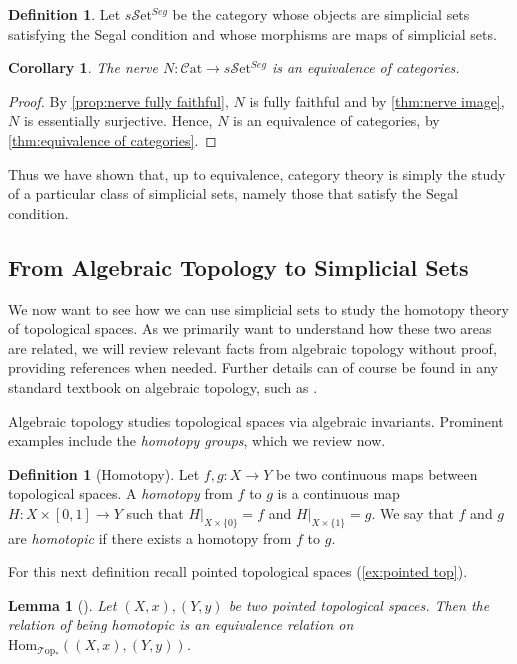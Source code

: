\documentclass[11pt, a4paper]{amsart}
\newcommand{\Hom}{\mathrm{Hom}}
\newcommand{\sSet}{s\mathscr{S}\mathrm{et}}
\newcommand{\Cat}{\mathscr{C}\mathrm{at}}
\newcommand{\Top}{\mathscr{T}\mathrm{op}}
\newtheorem{lemma}[equation]{Lemma}
\newtheorem{corollary}[equation]{Corollary}
\theoremstyle{definition}
\newtheorem{definition}[equation]{Definition}
\theoremstyle{remark}
\numberwithin{equation}{section}
\begin{document}
\begin{definition}
  Let $\sSet^{Seg}$ be the category whose objects are simplicial sets satisfying the Segal condition and whose morphisms are maps of simplicial sets.
\end{definition}

\begin{corollary} \label{cor:nerve equivalence}
  The nerve $N\colon \Cat \to \sSet^{Seg}$ is an equivalence of categories.
\end{corollary}

\begin{proof}
 By \cref{prop:nerve fully faithful}, $N$ is fully faithful and by \cref{thm:nerve image}, $N$ is essentially surjective. Hence, $N$ is an equivalence of categories, by \cref{thm:equivalence of categories}.
\end{proof}

Thus we have shown that, up to equivalence, category theory is simply the study of a particular class of simplicial sets, namely those that satisfy the Segal condition.

\subsection{From Algebraic Topology to Simplicial Sets} \label{subsec:top to ss}
We now want to see how we can use simplicial sets to study the homotopy theory of topological spaces. As we primarily want to understand how these two areas are related, we will review relevant facts from algebraic topology without proof, providing references when needed. Further details can of course be found in any standard textbook on algebraic topology, such as \cite{hatcher2002at}.

Algebraic topology studies topological spaces via algebraic invariants. Prominent examples include the \emph{homotopy groups}, which we review now.

\begin{definition}[Homotopy]
  Let $f,g\colon X \to Y$ be two continuous maps between topological spaces. A \emph{homotopy} from $f$ to $g$ is a continuous map $H\colon X \times [0,1] \to Y$ such that $H|_{X \times \{ 0\} } = f$ and $H|_{X \times \{ 1\} } = g$. We say that $f$ and $g$ are \emph{homotopic} if there exists a homotopy from $f$ to $g$.
\end{definition}

For this next definition recall pointed topological spaces (\cref{ex:pointed top}).
\begin{lemma}[{\cite[Section 1.1]{hatcher2002at}}]
 Let $(X,x), (Y,y)$ be two pointed topological spaces. Then the relation of being homotopic is an equivalence relation on $\Hom_{\Top_*}((X,x),(Y,y))$. 
\end{lemma}
\end{document}
